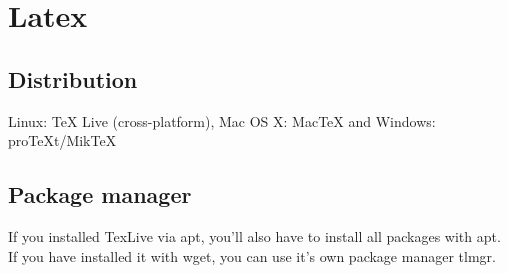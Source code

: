 \section{Latex}

\subsection{Distribution}
Linux: TeX Live (cross-platform), Mac OS X: MacTeX and Windows: proTeXt/MikTeX

\subsection{Package manager}
If you installed TexLive via apt, you'll also have to install all packages with apt. If you have installed it with wget, you can use it's own package manager tlmgr.